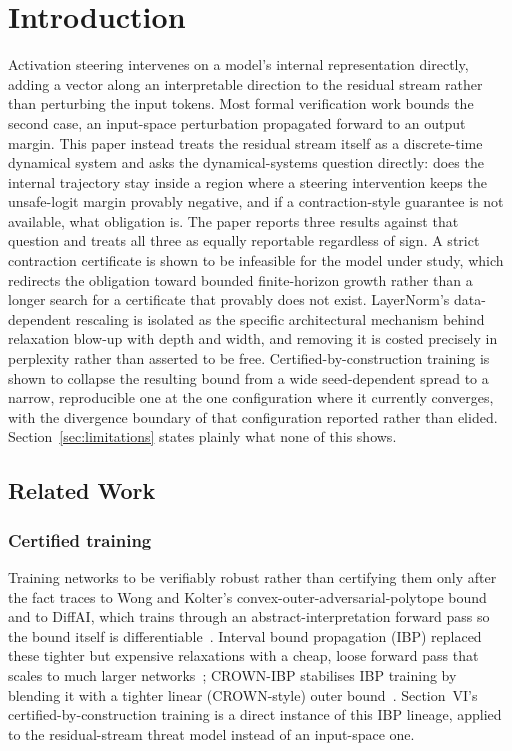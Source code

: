\documentclass[10pt,journal]{IEEEtran}
\begin{document}
\section{Introduction}
Activation steering intervenes on a model's internal representation directly, adding a vector along an interpretable direction to the residual stream rather than perturbing the input tokens. Most formal verification work bounds the second case, an input-space perturbation propagated forward to an output margin. This paper instead treats the residual stream itself as a discrete-time dynamical system and asks the dynamical-systems question directly: does the internal trajectory stay inside a region where a steering intervention keeps the unsafe-logit margin provably negative, and if a contraction-style guarantee is not available, what obligation is. The paper reports three results against that question and treats all three as equally reportable regardless of sign. A strict contraction certificate is shown to be infeasible for the model under study, which redirects the obligation toward bounded finite-horizon growth rather than a longer search for a certificate that provably does not exist. LayerNorm's data-dependent rescaling is isolated as the specific architectural mechanism behind relaxation blow-up with depth and width, and removing it is costed precisely in perplexity rather than asserted to be free. Certified-by-construction training is shown to collapse the resulting bound from a wide seed-dependent spread to a narrow, reproducible one at the one configuration where it currently converges, with the divergence boundary of that configuration reported rather than elided. Section~\ref{sec:limitations} states plainly what none of this shows.

\subsection{Related Work}
\subsubsection{Certified training}
Training networks to be verifiably robust rather than certifying them only after the fact traces to Wong and Kolter's convex-outer-adversarial-polytope bound~\cite{wong2018convex} and to DiffAI, which trains through an abstract-interpretation forward pass so the bound itself is differentiable~\cite{mirman2018diffai}. Interval bound propagation (IBP) replaced these tighter but expensive relaxations with a cheap, loose forward pass that scales to much larger networks~\cite{gowal2018ibp}; CROWN-IBP stabilises IBP training by blending it with a tighter linear (CROWN-style) outer bound~\cite{zhang2020crownibp}. Section~VI's certified-by-construction training is a direct instance of this IBP lineage, applied to the residual-stream threat model instead of an input-space one.
\end{document}
